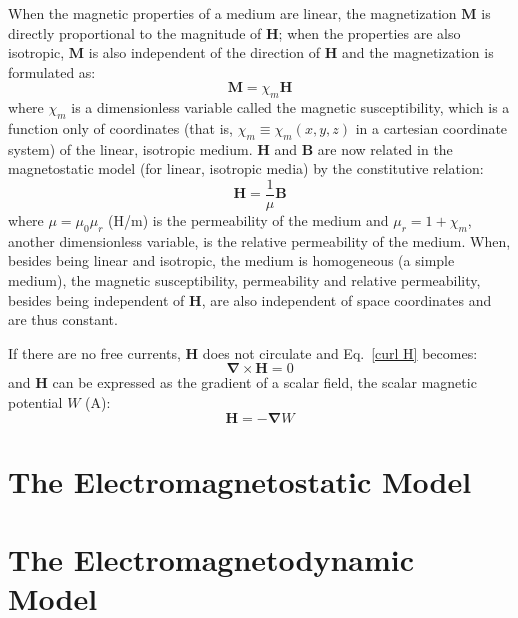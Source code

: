 When the magnetic properties of a medium are linear, the magnetization $\mathbf{M}$ is directly proportional to the magnitude of $\mathbf{H}$; when the properties are  also isotropic, $\mathbf{M}$ is also independent of the direction of $\mathbf{H}$ and the magnetization is formulated as:
\begin{equation}\label{chi_m}
\mathbf{M} = \chi_m \mathbf{H}
\end{equation}
{\noindent}where $\chi_m$ is a dimensionless variable called the magnetic susceptibility, which is a function only of coordinates (that is, $\chi_m \equiv \chi_m(x,y,z)$ in a cartesian coordinate system) of the linear, isotropic medium.
{\noindent}$\mathbf{H}$ and $\mathbf{B}$ are now related in the magnetostatic model (for linear, isotropic media) by the constitutive relation:
\begin{equation}\label{H chi_m}
\mathbf{H} = \frac{1}{\mu} \mathbf{B}
\end{equation}
{\noindent}where $\mu = \mu_0 \mu_r$ (H/m) is the permeability of the medium and $\mu_r =  1 + \chi_m$, another dimensionless variable, is the relative permeability of the medium.  When, besides being linear and isotropic, the medium is homogeneous (a simple medium), the magnetic susceptibility, permeability and relative permeability, besides being independent of $\mathbf{H}$, are also independent of space coordinates and are thus constant.

If there are no free currents, $\mathbf{H}$ does not circulate and Eq.~\ref{curl H} becomes:
\begin{equation}\label{curl H J=0}
\mathbf{\nabla} \times \mathbf{H} = 0
\end{equation}
{\noindent}and $\mathbf{H}$ can be expressed as the gradient of a scalar field, the scalar magnetic potential $W$ (A):
\begin{equation}\label{grad W}
\mathbf{H} = -\mathbf{\nabla}W
\end{equation}


\section{The Electromagnetostatic Model}\label{sec:electromagnetostatics}

\section{The Electromagnetodynamic Model}\label{sec:electromagnetodynamics}

